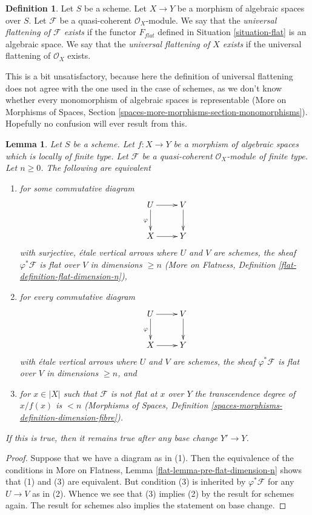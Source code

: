 \documentclass{stacks-project}
\theoremstyle{plain}
\newtheorem{lemma}[subsection]{Lemma}
\theoremstyle{definition}
\newtheorem{definition}[subsection]{Definition}
\theoremstyle{remark}
\numberwithin{equation}{subsection}
\begin{document}
\begin{definition}
\label{definition-flattening}
Let $S$ be a scheme.
Let $X \to Y$ be a morphism of algebraic spaces over $S$.
Let $\mathcal{F}$ be a quasi-coherent $\mathcal{O}_X$-module.
We say that the {\it universal flattening of $\mathcal{F}$ exists}
if the functor $F_{flat}$ defined in Situation \ref{situation-flat}
is an algebraic space.
We say that the {\it universal flattening of $X$ exists}
if the universal flattening of $\mathcal{O}_X$ exists.
\end{definition}

\noindent
This is a bit unsatisfactory, because here the definition of
universal flattening does not agree with the one used in the
case of schemes, as we don't know whether every monomorphism of
algebraic spaces is representable (More on Morphisms of Spaces,
Section \ref{spaces-more-morphisms-section-monomorphisms}).
Hopefully no confusion will ever result from this.

\begin{lemma}
\label{lemma-pre-flat-dimension-n}
Let $S$ be a scheme.
Let $f : X \to Y$ be a morphism of algebraic spaces which is
locally of finite type.
Let $\mathcal{F}$ be a quasi-coherent $\mathcal{O}_X$-module of finite
type. Let $n \geq 0$. The following are equivalent
\begin{enumerate}
\item for some commutative diagram
$$
\xymatrix{
U \ar[d]_\varphi \ar[r] & V \ar[d] \\
X \ar[r] & Y
}
$$
with surjective, \'etale vertical arrows where $U$ and $V$ are
schemes, the sheaf $\varphi^*\mathcal{F}$ is flat over $V$
in dimensions $\geq n$ (More on Flatness, Definition
\ref{flat-definition-flat-dimension-n}),
\item for every commutative diagram
$$
\xymatrix{
U \ar[d]_\varphi \ar[r] & V \ar[d] \\
X \ar[r] & Y
}
$$
with \'etale vertical arrows where $U$ and $V$ are schemes,
the sheaf $\varphi^*\mathcal{F}$ is flat over $V$ in dimensions $\geq n$, and
\item for $x \in |X|$ such that $\mathcal{F}$ is not flat at $x$
over $Y$ the transcendence degree of $x/f(x)$ is $< n$ (Morphisms of Spaces,
Definition \ref{spaces-morphisms-definition-dimension-fibre}).
\end{enumerate}
If this is true, then it remains true after any base change $Y' \to Y$.
\end{lemma}

\begin{proof}
Suppose that we have a diagram as in (1). Then the equivalence of
the conditions in More on Flatness, Lemma \ref{flat-lemma-pre-flat-dimension-n}
shows that (1) and (3) are equivalent. But condition (3) is inherited
by $\varphi^*\mathcal{F}$ for any $U \to V$ as in (2).
Whence we see that (3) implies (2) by the result for schemes again.
The result for schemes also implies the statement on base change.
\end{proof}
\end{document}
